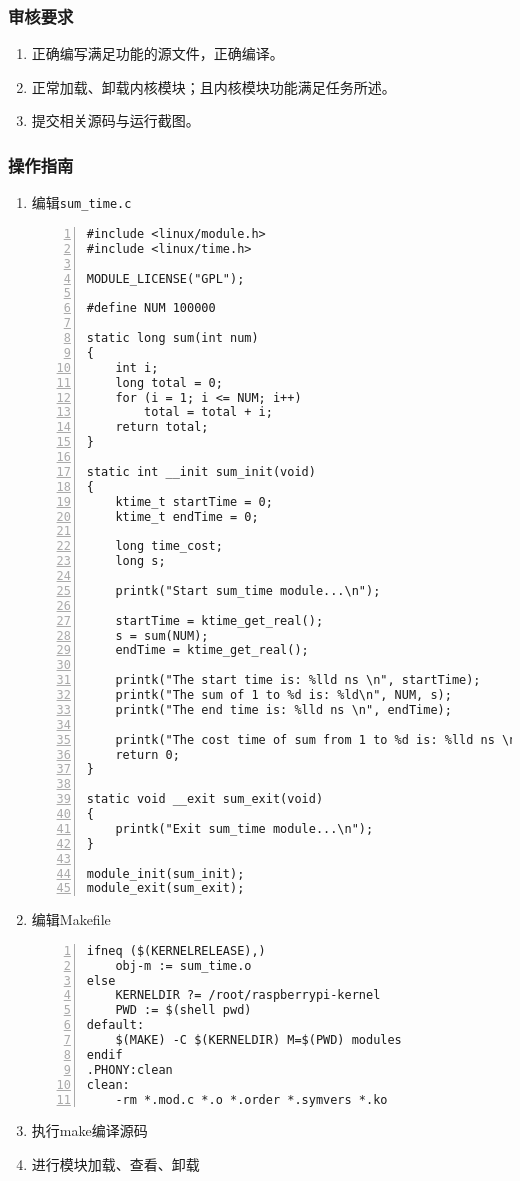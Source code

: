 \documentclass{article}
\begin{document}
\subsubsection{审核要求}
\begin{enumerate}
	\item 正确编写满足功能的源文件，正确编译。
	\item 正常加载、卸载内核模块；且内核模块功能满足任务所述。
	\item 提交相关源码与运行截图。
\end{enumerate}

\subsubsection{操作指南}
\begin{enumerate}
	\item 编辑\verb|sum_time.c|
	      \begin{lstlisting}[numbers=left]
#include <linux/module.h>
#include <linux/time.h>

MODULE_LICENSE("GPL");

#define NUM 100000

static long sum(int num)
{
	int i;
	long total = 0;
	for (i = 1; i <= NUM; i++)
		total = total + i;	
	return total;
}

static int __init sum_init(void)
{
	ktime_t startTime = 0;
    ktime_t endTime = 0;
    
	long time_cost;
	long s;

	printk("Start sum_time module...\n");
    
	startTime = ktime_get_real(); 
    s = sum(NUM);
    endTime = ktime_get_real(); 

	printk("The start time is: %lld ns \n", startTime);
    printk("The sum of 1 to %d is: %ld\n", NUM, s);
	printk("The end time is: %lld ns \n", endTime);
	
	printk("The cost time of sum from 1 to %d is: %lld ns \n", NUM, endTime - startTime);
	return 0;
}

static void __exit sum_exit(void)
{
	printk("Exit sum_time module...\n");
}

module_init(sum_init);
module_exit(sum_exit);

\end{lstlisting}
	\item 编辑Makefile
	      \begin{lstlisting}[numbers=left]
ifneq ($(KERNELRELEASE),)
	obj-m := sum_time.o
else
	KERNELDIR ?= /root/raspberrypi-kernel
	PWD := $(shell pwd)
default:
	$(MAKE) -C $(KERNELDIR) M=$(PWD) modules
endif
.PHONY:clean
clean:
	-rm *.mod.c *.o *.order *.symvers *.ko

\end{lstlisting}
	\item 执行make编译源码
	\item 进行模块加载、查看、卸载
\end{enumerate}
\end{document}
